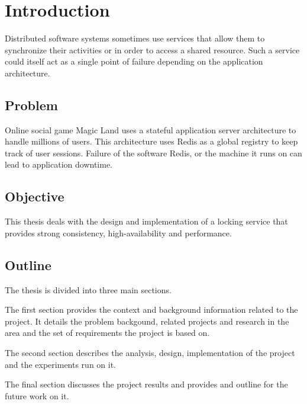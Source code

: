 \chapter{Introduction}
\label{chapter:introduction}

Distributed software systems sometimes use services that allow them to 
synchronize their activities or in order to access a shared resource. Such a
service could itself act as a single point of failure depending on the
application architecture.

\section{Problem}

Online social game Magic Land uses a stateful application server architecture to
handle millions of users. This architecture uses Redis as a global registry to
keep track of user sessions. Failure of the software Redis, or the machine it
runs on can lead to application downtime.

\section{Objective}

This thesis deals with the design and implementation of a locking service that
provides strong consistency, high-availability and performance.

\section{Outline}
The thesis is divided into three main sections.

The first section provides the context and background information related to the
project. It details the problem backgound, related projects and research in the
area and the set of requirements the project is based on.

The second section describes the analysis, design, implementation of the project
and the experiments run on it.

The final section discusses the project results and provides and outline for
the future work on it.

